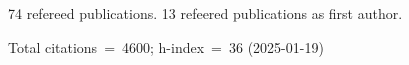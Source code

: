 74 refereed publications. 13 refeered publications as first author.

Total citations~=~4600; h-index~=~36 (2025-01-19)